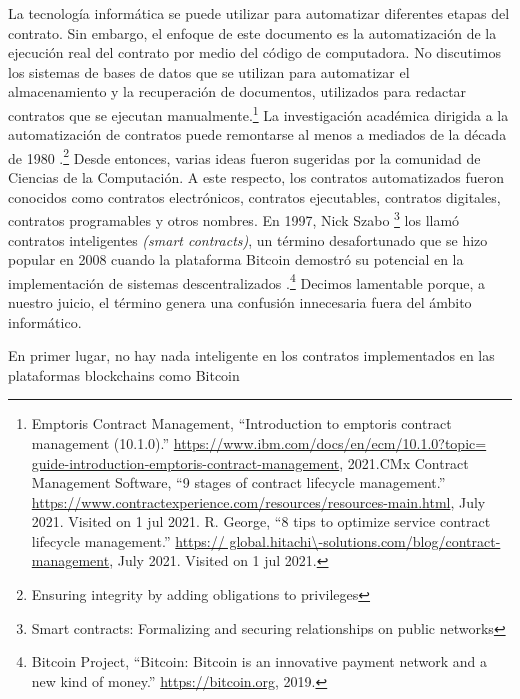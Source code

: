 \documentclass[12pt]{report} %
\begin{document}
\begin{itemize}
La tecnología informática se puede utilizar para automatizar diferentes etapas del contrato. Sin embargo, el enfoque de este documento es la automatización de la ejecución real del contrato por medio del código de computadora. No discutimos los sistemas de bases de datos que se utilizan para automatizar el almacenamiento y la recuperación de documentos, utilizados para redactar contratos que se ejecutan manualmente.\footnote{Emptoris Contract Management, “Introduction to emptoris contract management (10.1.0).” \url{https://www.ibm.com/docs/en/ecm/10.1.0?topic= guide-introduction-emptoris-contract-management},
2021.CMx Contract Management Software, “9 stages of contract lifecycle management.” \url{https://www.contractexperience.com/resources/resources-main.html}, July 2021. Visited on 1 jul 2021.  R. George, “8 tips to optimize service contract lifecycle management.” \url{https:// global.hitachi\-solutions.com/blog/contract-management}, July 2021. Visited on 1 jul 2021.} La investigación académica dirigida a la automatización de contratos puede remontarse al menos a mediados de la década de 1980 .\footnote{\cite{Minsky1985}Ensuring integrity by adding obligations to privileges} Desde entonces, varias ideas fueron sugeridas por la comunidad de Ciencias de la Computación. A este respecto, los contratos automatizados fueron conocidos como contratos electrónicos, contratos ejecutables, contratos digitales, contratos programables y otros nombres. 
En 1997, Nick Szabo \footnote{\cite{Szabo1997} Smart contracts: Formalizing and securing relationships on public networks} los llamó contratos inteligentes \textit{(smart contracts)}, un término desafortunado que se hizo popular en 2008 cuando la plataforma Bitcoin demostró su potencial en la implementación de sistemas descentralizados .\footnote{Bitcoin Project, “Bitcoin: Bitcoin is an innovative payment network and a new kind of money.” \url{https://bitcoin.org}, 2019.} Decimos lamentable porque, a nuestro juicio, el término genera una confusión innecesaria fuera del ámbito informático. 
 
En primer lugar, no hay nada inteligente en los contratos implementados en las plataformas blockchains como Bitcoin 


\end{itemize}
\end{document}
